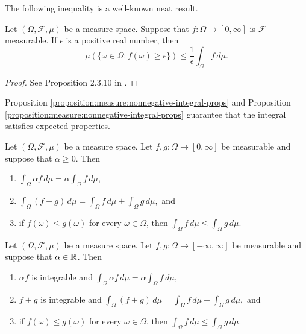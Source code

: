 The following inequality is a well-known neat result.

\begin{proposition}
\label{proposition:measure:ineqn:markov}
Let $(\Omega, \mathcal{F}, \mu)$ be a measure space. Suppose that $f : \Omega \to [0, \infty]$ is $\mathcal{F}$-measurable.
If $\epsilon$ is a positive real number, then \[
    \mu( \{ \omega \in \Omega : f(\omega) \geq \epsilon \}) \leq \frac{1}{\epsilon} \int_\Omega f \, d\mu.
\]
\end{proposition}
\begin{proof}
See Proposition 2.3.10 in \cite{cohn_2013_measure}.
\end{proof}

Proposition \ref{proposition:measure:nonnegative-integral-props} and Proposition \ref{proposition:measure:nonnegative-integral-props} guarantee that the integral satisfies expected properties.

\begin{proposition}
\label{proposition:measure:nonnegative-integral-props}
Let $(\Omega, \mathcal{F}, \mu)$ be a measure space. Let $f, g : \Omega \to [0, \infty]$ be measurable and suppose that $\alpha \geq 0$. Then 
\begin{enumerate}[noitemsep]
    \item $\int_{\Omega} \alpha f \, d\mu =  \alpha \int_{\Omega} f \, d\mu,$
    \item $\int_{\Omega} (f+g) \, d\mu =  \int_{\Omega} f \, d\mu +  \int_{\Omega} g \, d\mu,$ and
    \item if $f(\omega) \leq g(\omega)$ for every $\omega 
    \in \Omega$, then $\int_\Omega f \, d\mu \leq \int_\Omega g \, d\mu$.
\end{enumerate}
\end{proposition}

\begin{proposition}
\label{proposition:measure:integral-props}
Let $(\Omega, \mathcal{F}, \mu)$ be a measure space. Let $f, g : \Omega \to [-\infty, \infty]$ be measurable and suppose that $\alpha \in {\mathbb R}$. Then 
\begin{enumerate}[noitemsep]
    \item $\alpha f$ is integrable and $\int_{\Omega} \alpha f \, d\mu =  \alpha \int_{\Omega} f \, d\mu,$
    \item $f + g$ is integrable and $\int_{\Omega} (f+g) \, d\mu =  \int_{\Omega} f \, d\mu +  \int_{\Omega} g \, d\mu,$ and
    \item if $f(\omega) \leq g(\omega)$ for every $\omega 
    \in \Omega$, then $\int_\Omega f \, d\mu \leq \int_\Omega g \, d\mu$.
\end{enumerate}
\end{proposition}

